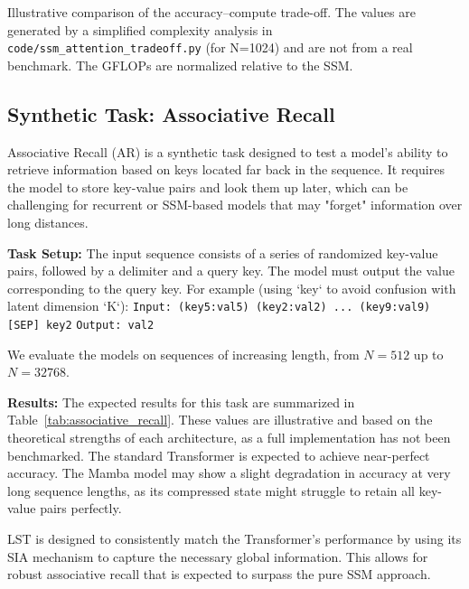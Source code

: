 \documentclass[10pt,twocolumn,letterpaper]{article}
\begin{document}
\begin{table}[h]
\centering
{}
\caption{Illustrative comparison of the accuracy--compute trade-off. The values are generated by a simplified complexity analysis in \texttt{code/ssm\_attention\_tradeoff.py} (for N=1024) and are not from a real benchmark. The GFLOPs are normalized relative to the SSM.}
\label{tab:ssm_attn_tradeoff}
\end{table}

\subsection{Synthetic Task: Associative Recall}

Associative Recall (AR) is a synthetic task designed to test a model's ability to retrieve information based on keys located far back in the sequence. It requires the model to store key-value pairs and look them up later, which can be challenging for recurrent or SSM-based models that may "forget" information over long distances.

\textbf{Task Setup:} The input sequence consists of a series of randomized key-value pairs, followed by a delimiter and a query key. The model must output the value corresponding to the query key. For example (using `key` to avoid confusion with latent dimension `K`):
\texttt{Input: (key5:val5) (key2:val2) ... (key9:val9) [SEP] key2}
\texttt{Output: val2}

We evaluate the models on sequences of increasing length, from \(N=512\) up to \(N=32768\).

\textbf{Results:} The expected results for this task are summarized in Table~\ref{tab:associative_recall}. These values are illustrative and based on the theoretical strengths of each architecture, as a full implementation has not been benchmarked. The standard Transformer is expected to achieve near-perfect accuracy. The Mamba model may show a slight degradation in accuracy at very long sequence lengths, as its compressed state might struggle to retain all key-value pairs perfectly.

LST is designed to consistently match the Transformer's performance by using its SIA mechanism to capture the necessary global information. This allows for robust associative recall that is expected to surpass the pure SSM approach.
\end{document}
